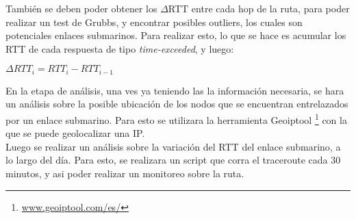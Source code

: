 También se deben poder obtener los $\Delta$RTT entre cada hop de la ruta, para poder realizar un test de Grubbs, y encontrar posibles outliers, los cuales son potenciales enlaces submarinos. Para realizar esto, lo que se hace es acumular los RTT de cada respuesta de tipo \textit{time-exceeded}, y luego:

\begin{center}
	$\Delta RTT_i = RTT_i - RTT_{i-1} $
\end{center}

En la etapa de análisis, una ves ya teniendo las la información necesaria, se hara un análisis sobre la posible ubicación de los nodos que se encuentran entrelazados por un enlace submarino. Para esto se utilizara la herramienta Geoiptool \footnote{\url{www.geoiptool.com/es/}} con la que se puede geolocalizar una IP.\\

Luego se realizar un análisis sobre la variación del RTT del enlace submarino, a lo largo del día. Para esto, se realizara un script que corra el traceroute cada 30 minutos, y asi poder realizar un monitoreo sobre la ruta.

